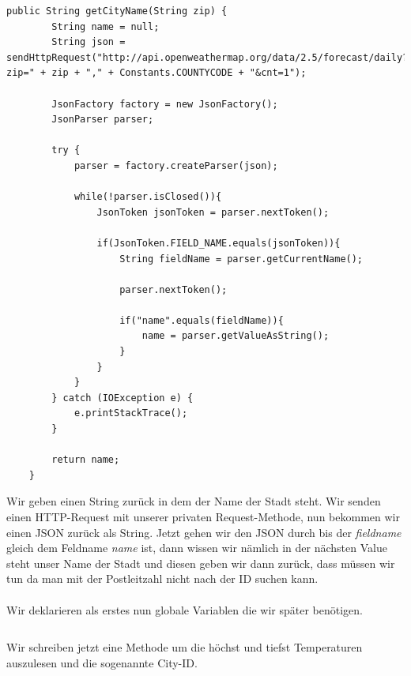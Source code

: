 \begin{lstlisting}
public String getCityName(String zip) {
        String name = null;
        String json = sendHttpRequest("http://api.openweathermap.org/data/2.5/forecast/daily?zip=" + zip + "," + Constants.COUNTYCODE + "&cnt=1");

        JsonFactory factory = new JsonFactory();
        JsonParser parser;

        try {
            parser = factory.createParser(json);

            while(!parser.isClosed()){
                JsonToken jsonToken = parser.nextToken();

                if(JsonToken.FIELD_NAME.equals(jsonToken)){
                    String fieldName = parser.getCurrentName();

                    parser.nextToken();

                    if("name".equals(fieldName)){
                        name = parser.getValueAsString();
                    }
                }
            }
        } catch (IOException e) {
            e.printStackTrace();
        }

        return name;
    }
\end{lstlisting}

Wir geben einen String zurück in dem der Name der Stadt steht. Wir senden einen HTTP-Request mit unserer privaten Request-Methode, nun bekommen wir einen JSON zurück als String. Jetzt gehen wir den JSON durch bis der \textit{fieldname} gleich dem Feldname \textit{name} ist, dann wissen wir nämlich in der nächsten Value steht unser Name der Stadt und diesen geben wir dann zurück, dass müssen wir tun da man mit der Postleitzahl nicht nach der ID suchen kann.\\\\

Wir deklarieren als erstes nun globale Variablen die wir später benötigen.

\begin{lstlisting}

\end{lstlisting}

Wir schreiben jetzt eine Methode um die höchst und tiefst Temperaturen auszulesen und die sogenannte City-ID.

